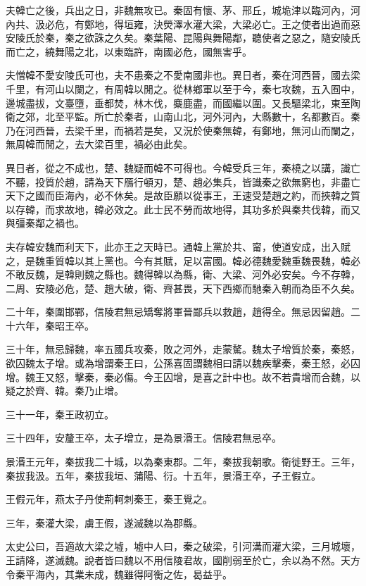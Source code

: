 夫韓亡之後，兵出之日，非魏無攻已。秦固有懷、茅、邢丘，城垝津以臨河內，河內共、汲必危，有鄭地，得垣雍，決熒澤水灌大梁，大梁必亡。王之使者出過而惡安陵氏於秦，秦之欲誅之久矣。秦葉陽、昆陽與舞陽鄰，聽使者之惡之，隨安陵氏而亡之，繞舞陽之北，以東臨許，南國必危，國無害乎。

夫憎韓不愛安陵氏可也，夫不患秦之不愛南國非也。異日者，秦在河西晉，國去梁千里，有河山以闌之，有周韓以閒之。從林鄉軍以至于今，秦七攻魏，五入囿中，邊城盡拔，文臺墮，垂都焚，林木伐，麋鹿盡，而國繼以圍。又長驅梁北，東至陶衛之郊，北至平監。所亡於秦者，山南山北，河外河內，大縣數十，名都數百。秦乃在河西晉，去梁千里，而禍若是矣，又況於使秦無韓，有鄭地，無河山而闌之，無周韓而閒之，去大梁百里，禍必由此矣。

異日者，從之不成也，楚、魏疑而韓不可得也。今韓受兵三年，秦橈之以講，識亡不聽，投質於趙，請為天下鴈行頓刃，楚、趙必集兵，皆識秦之欲無窮也，非盡亡天下之國而臣海內，必不休矣。是故臣願以從事王，王速受楚趙之約，而挾韓之質以存韓，而求故地，韓必效之。此士民不勞而故地得，其功多於與秦共伐韓，而又與彊秦鄰之禍也。

夫存韓安魏而利天下，此亦王之天時已。通韓上黨於共、甯，使道安成，出入賦之，是魏重質韓以其上黨也。今有其賦，足以富國。韓必德魏愛魏重魏畏魏，韓必不敢反魏，是韓則魏之縣也。魏得韓以為縣，衛、大梁、河外必安矣。今不存韓，二周、安陵必危，楚、趙大破，衛、齊甚畏，天下西鄉而馳秦入朝而為臣不久矣。

二十年，秦圍邯鄲，信陵君無忌矯奪將軍晉鄙兵以救趙，趙得全。無忌因留趙。二十六年，秦昭王卒。

三十年，無忌歸魏，率五國兵攻秦，敗之河外，走蒙驁。魏太子增質於秦，秦怒，欲囚魏太子增。或為增謂秦王曰，公孫喜固謂魏相曰請以魏疾擊秦，秦王怒，必囚增。魏王又怒，擊秦，秦必傷。今王囚增，是喜之計中也。故不若貴增而合魏，以疑之於齊、韓。秦乃止增。

三十一年，秦王政初立。

三十四年，安釐王卒，太子增立，是為景湣王。信陵君無忌卒。

景湣王元年，秦拔我二十城，以為秦東郡。二年，秦拔我朝歌。衛徙野王。三年，秦拔我汲。五年，秦拔我垣、蒲陽、衍。十五年，景湣王卒，子王假立。

王假元年，燕太子丹使荊軻刺秦王，秦王覺之。

三年，秦灌大梁，虜王假，遂滅魏以為郡縣。

太史公曰，吾適故大梁之墟，墟中人曰，秦之破梁，引河溝而灌大梁，三月城壞，王請降，遂滅魏。說者皆曰魏以不用信陵君故，國削弱至於亡，余以為不然。天方令秦平海內，其業未成，魏雖得阿衡之佐，曷益乎。